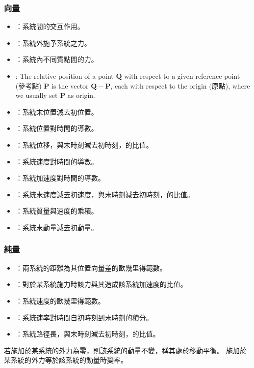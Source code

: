 \documentclass[a4paper,12pt]{article}
\begin{document}
\subsubsection{向量}
\begin{itemize}
    \item{}：系統間的交互作用。
\item{}：系統外施予系統之力。
\item{}：系統內不同質點間的力。
\item{}: The relative position of a point $\mathbf{Q}$ with respect to a given reference point (參考點) $\mathbf{P}$ is the vector $\mathbf{Q}-\mathbf{P}$, each with respect to the origin (原點), where we usually set $\mathbf{P}$ as origin.
\item{}：系統末位置減去初位置。
\item{}：系統位置對時間的導數。
\item{}：系統位移，與末時刻減去初時刻，的比值。
\item{}：系統速度對時間的導數。
\item{}：系統加速度對時間的導數。
\item{}：系統末速度減去初速度，與末時刻減去初時刻，的比值。
\item{}：系統質量與速度的乘積。
\item{}：系統末動量減去初動量。
\end{itemize}
\subsubsection{純量}
\begin{itemize}
\item{}：兩系統的距離為其位置向量差的歐幾里得範數。
\item{}：對於某系統施力時該力與其造成該系統加速度的比值。
\item{}：系統速度的歐幾里得範數。
\item{}：系統速率對時間自初時刻到末時刻的積分。
\item{}：系統路徑長，與末時刻減去初時刻，的比值。
\end{itemize}
若施加於某系統的外力為零，則該系統的動量不變，稱其處於移動平衡。
施加於某系統的外力等於該系統的動量時變率。
\end{document}
